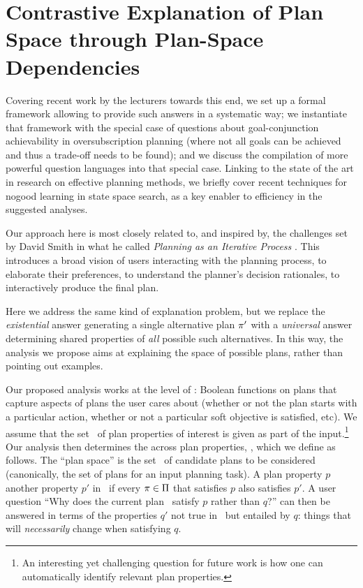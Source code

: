 \section{Contrastive Explanation of Plan Space through Plan-Space Dependencies}
\label{xpp}


Covering recent work by the lecturers towards this end, we set up a
formal framework allowing to provide such answers in a systematic way;
we instantiate that framework with the special case of questions about
goal-conjunction achievability in oversubscription planning (where not
all goals can be achieved and thus a trade-off needs to be found); and
we discuss the compilation of more powerful question languages into
that special case. Linking to the state of the art in research on
effective planning methods, we briefly cover recent techniques for
nogood learning in state space search, as a key enabler to efficiency
in the suggested analyses.



Our approach here is most closely related to, and inspired by, the
challenges set by David Smith in what he called \emph{Planning as an
  Iterative Process} \cite{smith:aaai-12}. This introduces a broad
vision of users interacting with the planning process, to elaborate
their preferences, to understand the planner's decision rationales, to
interactively produce the final plan. 



Here we address the same kind of explanation problem, but we replace
the \emph{existential} answer generating a single alternative plan
$\pi'$ with a \emph{universal} answer determining shared properties
of \emph{all} possible such alternatives. In this way, the analysis we
propose aims at explaining the space of possible plans, rather than
pointing out examples.

Our proposed analysis works at the level of :
Boolean functions on plans that capture aspects of plans the user
cares about (whether or not the plan starts with a particular action,
whether or not a particular soft objective is satisfied, etc). We
assume that the set \props\ of plan properties of interest is given as
part of the input.\footnote{An interesting yet challenging question
  for future work is how one can automatically identify relevant plan
  properties.} Our analysis then determines the 
across plan properties, \ie,  which we
define as follows. The ``plan space'' is the set \plans\ of candidate
plans to be considered (canonically, the set of plans for an input
planning task). A plan property $p$  another property
$p'$ in \plans\ if every $\pi \in \Pi$ that satisfies $p$ also
satisfies $p'$. A user question ``Why does the current plan
\plan\ satisfy $p$ rather than $q$?'' can then be answered in terms of
the properties $q'$ not true in \plan\ but entailed by $q$: things
that will \emph{necessarily} change when satisfying $q$.

